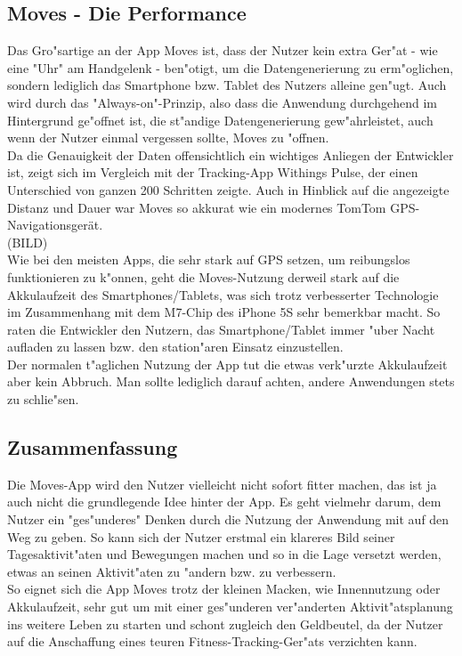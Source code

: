 \subsection{Moves - Die Performance}
\label{ch:Apps:sec:Moves:subsec:PERF}

Das Gro"sartige an der App Moves ist, dass der Nutzer kein extra Ger"at - wie eine "Uhr" am Handgelenk - ben"otigt, um die Datengenerierung zu erm"oglichen, sondern lediglich das Smartphone bzw. Tablet des Nutzers alleine gen"ugt. 
Auch wird durch das "Always-on"-Prinzip, also dass die Anwendung durchgehend im Hintergrund ge"offnet ist, die st"andige Datengenerierung gew"ahrleistet, auch wenn der Nutzer einmal vergessen sollte, Moves zu "offnen.
\\
Da die Genauigkeit der Daten offensichtlich ein wichtiges Anliegen der Entwickler ist, zeigt sich im Vergleich mit der Tracking-App Withings Pulse, der einen Unterschied von ganzen 200 Schritten zeigte. 
Auch in Hinblick auf die angezeigte Distanz und Dauer war Moves so akkurat wie ein modernes TomTom GPS-Navigationsgerät.
\\
(BILD)
\\
Wie bei den meisten Apps, die sehr stark auf GPS setzen, um reibungslos funktionieren zu k"onnen, geht die Moves-Nutzung derweil stark auf die Akkulaufzeit des Smartphones/Tablets, was sich trotz verbesserter Technologie im Zusammenhang mit dem M7-Chip des iPhone 5S sehr bemerkbar macht. 
So raten die Entwickler den Nutzern, das Smartphone/Tablet immer "uber Nacht aufladen zu lassen bzw. den station"aren Einsatz einzustellen.
\\
Der normalen t"aglichen Nutzung der App tut die etwas verk"urzte Akkulaufzeit aber kein Abbruch. 
Man sollte lediglich darauf achten, andere Anwendungen stets zu schlie"sen.

\subsection{Zusammenfassung}
\label{ch:Apps:sec:Moves:subsec:VERDICT} 

Die Moves-App wird den Nutzer vielleicht nicht sofort fitter machen, das ist ja auch nicht die grundlegende Idee hinter der App. 
Es geht vielmehr darum, dem Nutzer ein "ges"underes" Denken durch die Nutzung der Anwendung mit auf den Weg zu geben. 
So kann sich der Nutzer erstmal ein klareres Bild seiner Tagesaktivit"aten und Bewegungen machen und so in die Lage versetzt werden, etwas an seinen Aktivit"aten zu "andern bzw. zu verbessern.
\\
So eignet sich die App Moves trotz der kleinen Macken, wie Innennutzung oder Akkulaufzeit, sehr gut um mit einer ges"underen ver"anderten Aktivit"atsplanung ins weitere Leben zu starten und schont zugleich den Geldbeutel, da der Nutzer auf die Anschaffung eines teuren Fitness-Tracking-Ger"ats verzichten kann.

